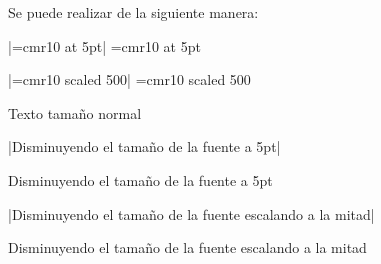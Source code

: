 


\bigskip


\bigskip

\respuestaS Se puede realizar de la siguiente manera:

|\font\mitaduno=cmr10 at 5pt|
\font\mitaduno=cmr10 at 5pt

|\font\mitaddos=cmr10 scaled 500|
\font\mitaddos=cmr10 scaled 500

Texto tama\~no normal

|\mitaduno Disminuyendo el tama\~no de la fuente a 5pt|

\mitaduno Disminuyendo el tama\~no de la fuente a 5pt

|\mitaddos Disminuyendo el tama\~no de la fuente escalando a la mitad|

\mitaddos Disminuyendo el tama\~no de la fuente escalando a la mitad

\bye

